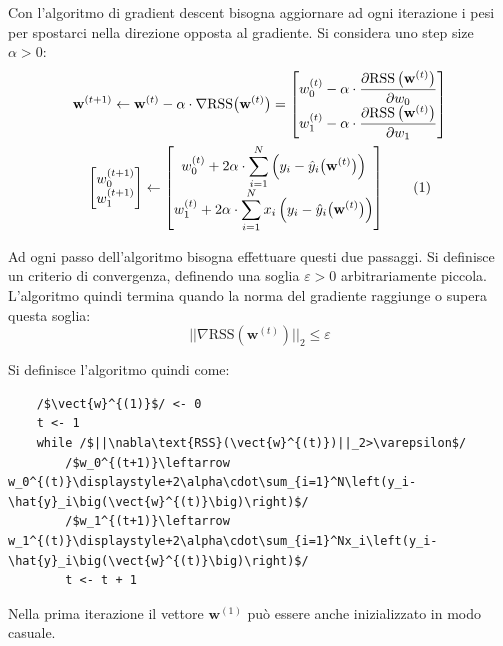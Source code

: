 \documentclass{article}
\numberwithin{equation}{subsection}
\newcommand{\tageq}{\tag{\stepcounter{equation}\theequation}}
\newcommand{\vect}[1]{\boldsymbol{\mathbf{#1}}}
\begin{document}
Con l'algoritmo di gradient descent bisogna aggiornare ad ogni iterazione i pesi 
per spostarci nella direzione opposta al gradiente. Si considera uno step size $\alpha>0$:
\begin{gather*}
    \vect{w}^{(t+1)}\leftarrow\vect{w}^{(t)}-\alpha\cdot\nabla\text{RSS}\big(\vect{w}^{(t)}\big)=\begin{bmatrix}
        w_0^{(t)}-\alpha\cdot\displaystyle\frac{\partial\text{RSS}\left(\vect{w}^{(t)}\right)}{\partial w_0}\\
        w_1^{(t)}-\alpha\cdot\displaystyle\frac{\partial\text{RSS}\left(\vect{w}^{(t)}\right)}{\partial w_1}
    \end{bmatrix}\\
    \begin{bmatrix}
        w_0^{(t+1)}\strut\\
        w_1^{(t+1)}\strut
    \end{bmatrix}\leftarrow\begin{bmatrix}
        w_0^{(t)}\displaystyle+2\alpha\cdot\sum_{i=1}^N\left(y_i-\hat{y}_i\big(\vect{w}^{(t)}\big)\right)\\
        w_1^{(t)}\displaystyle+2\alpha\cdot\sum_{i=1}^Nx_i\left(y_i-\hat{y}_i\big(\vect{w}^{(t)}\big)\right)
    \end{bmatrix}\tageq
\end{gather*}

Ad ogni passo dell'algoritmo bisogna effettuare questi due passaggi. Si definisce un criterio di convergenza, definendo una soglia $\varepsilon>0$ arbitrariamente piccola. 
L'algoritmo quindi termina quando la norma del gradiente raggiunge o supera questa soglia:
\begin{equation}
    ||\nabla\text{RSS}(\vect{w}^{(t)})||_2\leq\varepsilon
\end{equation}

Si definisce l'algoritmo quindi come:
\begin{verbatim}
    /$\vect{w}^{(1)}$/ <- 0
    t <- 1
    while /$||\nabla\text{RSS}(\vect{w}^{(t)})||_2>\varepsilon$/
        /$w_0^{(t+1)}\leftarrow w_0^{(t)}\displaystyle+2\alpha\cdot\sum_{i=1}^N\left(y_i-\hat{y}_i\big(\vect{w}^{(t)}\big)\right)$/
        /$w_1^{(t+1)}\leftarrow w_1^{(t)}\displaystyle+2\alpha\cdot\sum_{i=1}^Nx_i\left(y_i-\hat{y}_i\big(\vect{w}^{(t)}\big)\right)$/
        t <- t + 1
\end{verbatim}

Nella prima iterazione il vettore $\vect{w}^{(1)}$ può essere anche inizializzato in modo 
casuale. 
\end{document}
